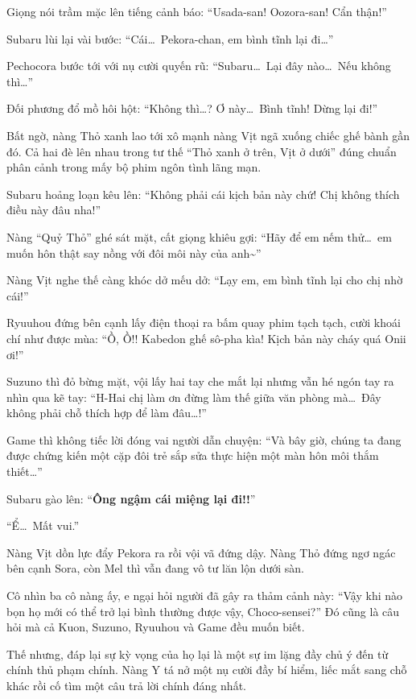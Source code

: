 \documentclass[../main.tex]{subfiles}
\begin{document}
Giọng nói trầm mặc lên tiếng cảnh báo: ``Usada-san! Oozora-san! Cẩn thận!''

Subaru lùi lại vài bước: ``Cái\dots\ Pekora-chan, em bình tĩnh lại đi\dots''

Pechocora bước tới với nụ cười quyến rũ: ``Subaru\dots\ Lại đây nào\dots\ Nếu không thì\dots''

Đối phương đổ mồ hôi hột: ``Không thì\dots? Ơ này\dots\ Bình tĩnh! Dừng lại đi!''

Bất ngờ, nàng Thỏ xanh lao tới xô mạnh nàng Vịt ngã xuống chiếc ghế bành gần đó. Cả hai đè lên nhau trong tư thế ``Thỏ xanh ở trên, Vịt ở dưới'' đúng chuẩn phân cảnh trong mấy bộ phim ngôn tình lãng mạn.


Subaru hoảng loạn kêu lên: ``Không phải cái kịch bản này chứ! Chị không thích điều này đâu nha!''

Nàng ``Quỷ Thỏ'' ghé sát mặt, cất giọng khiêu gợi: ``Hãy để em nếm thử\dots\ em muốn hôn thật say nồng với đôi môi này của anh\~{}''

Nàng Vịt nghe thế càng khóc dở mếu dở: ``Lạy em, em bình tĩnh lại cho chị nhờ cái!''

Ryuuhou đứng bên cạnh lấy điện thoại ra bấm quay phim tạch tạch, cười khoái chí như được mùa: ``Ồ, Ồ!! Kabedon ghế sô-pha kìa! Kịch bản này cháy quá Onii ơi!''

Suzuno thì đỏ bừng mặt, vội lấy hai tay che mắt lại nhưng vẫn hé ngón tay ra nhìn qua kẽ tay: ``H-Hai chị làm ơn đừng làm thế giữa văn phòng mà\dots\ Đây không phải chỗ thích hợp để làm đâu\dots!''

Game thì không tiếc lời đóng vai người dẫn chuyện: ``Và bây giờ, chúng ta đang được chứng kiến một cặp đôi trẻ sắp sửa thực hiện một màn hôn môi thắm thiết\dots''

Subaru gào lên: ``\textbf{Ông ngậm cái miệng lại đi!!}''

``Ể\dots\ Mất vui.''

Nàng Vịt dồn lực đẩy Pekora ra rồi vội vã đứng dậy. Nàng Thỏ đứng ngơ ngác bên cạnh Sora, còn Mel thì vẫn đang vô tư lăn lộn dưới sàn.

Cô nhìn ba cô nàng ấy, e ngại hỏi người đã gây ra thảm cảnh này: ``Vậy khi nào bọn họ mới có thể trở lại bình thường được vậy, Choco-sensei?'' Đó cũng là câu hỏi mà cả Kuon, Suzuno, Ryuuhou và Game đều muốn biết.


Thế nhưng, đáp lại sự kỳ vọng của họ lại là một sự im lặng đầy chủ ý đến từ chính thủ phạm chính. Nàng Y tá nở một nụ cười đầy bí hiểm, liếc mắt sang chỗ khác rồi cố tìm một câu trả lời chính đáng nhất.
\end{document}
